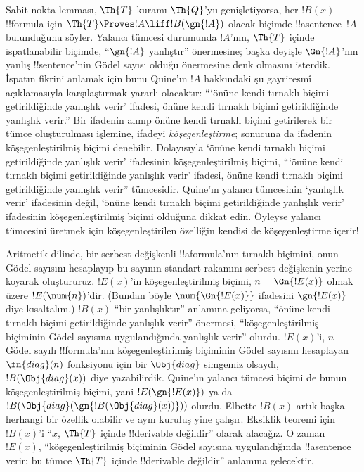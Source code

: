 



\begin{explain}
Sabit nokta lemması, $\Th{T}$ kuramı $\Th{Q}$'yu genişletiyorsa, her
$!B(x)$ !!{formula} için $\Th{T} \Proves !A \liff !B(\gn{!A})$ olacak
biçimde !!a{sentence}~$!A$ bulunduğunu söyler. Yalancı tümcesi durumunda
$!A$'nın, $\Th{T}$ içinde ispatlanabilir biçimde, ``$\gn{!A}$ yanlıştır''
önermesine; başka deyişle $\Gn{!A}$'nın yanlış !!{sentence}'nin G\"odel
sayısı olduğu önermesine denk olmasını isterdik. İspatın fikrini anlamak için
bunu Quine'ın $!A$ hakkındaki şu gayriresmî açıklamasıyla karşılaştırmak
yararlı olacaktır: ``{}`önüne kendi tırnaklı biçimi getirildiğinde yanlışlık
verir' ifadesi, önüne kendi tırnaklı biçimi getirildiğinde yanlışlık verir.''
Bir ifadenin alınıp önüne kendi tırnaklı biçimi getirilerek bir tümce
oluşturulması işlemine, ifadeyi \emph{köşegenleştirme}; sonucuna da ifadenin
köşegenleştirilmiş biçimi denebilir. Dolayısıyla `önüne kendi tırnaklı biçimi
getirildiğinde yanlışlık verir' ifadesinin köşegenleştirilmiş biçimi,
``{}`önüne kendi tırnaklı biçimi getirildiğinde yanlışlık verir' ifadesi,
önüne kendi tırnaklı biçimi getirildiğinde yanlışlık verir'' tümcesidir.
Quine'ın yalancı tümcesinin `yanlışlık verir' ifadesinin değil, `önüne kendi
tırnaklı biçimi getirildiğinde yanlışlık verir' ifadesinin köşegenleştirilmiş
biçimi olduğuna dikkat edin. Öyleyse yalancı tümcesini üretmek için
köşegenleştirilen özelliğin kendisi de köşegenleştirme içerir!{}

Aritmetik dilinde, bir serbest değişkenli !!a{formula}'nın tırnaklı biçimini,
onun G\"odel sayısını hesaplayıp bu sayının standart rakamını serbest
değişkenin yerine koyarak oluştururuz. $!E(x)$'in köşegenleştirilmiş biçimi,
$n=\Gn{!E(x)}$ olmak üzere $!E(\num{n})$'dir. (Bundan böyle
$\num{\Gn{!E(x)}}$ ifadesini $\gn{!E(x)}$ diye kısaltalım.) $!B(x)$ ``bir
yanlışlıktır'' anlamına geliyorsa, ``önüne kendi tırnaklı biçimi getirildiğinde
yanlışlık verir'' önermesi, ``köşegenleştirilmiş biçiminin G\"odel sayısına
uygulandığında yanlışlık verir'' olurdu. $!E(x)$'i, $n$ G\"odel sayılı
!!{formula}'nın köşegenleştirilmiş biçiminin G\"odel sayısını hesaplayan
$\fn{diag}(n)$ fonksiyonu için bir $\Obj{diag}$ simgemiz olsaydı,
$!B(\Obj{diag}(x))$ diye yazabilirdik. Quine'ın yalancı tümcesi biçimi de
bunun köşegenleştirilmiş biçimi, yani $!E(\gn{!E(x)})$ ya da
$!B(\Obj{diag}(\gn{!B(\Obj{diag}(x))}))$ olurdu. Elbette $!B(x)$ artık başka
herhangi bir özellik olabilir ve aynı kuruluş yine çalışır. Eksiklik teoremi
için $!B(x)$'i ``$x$, $\Th{T}$ içinde !!{derivable} değildir'' olarak
alacağız. O zaman $!E(x)$, ``köşegenleştirilmiş biçiminin G\"odel sayısına
uygulandığında !!a{sentence} verir; bu tümce $\Th{T}$ içinde !!{derivable}
değildir'' anlamına gelecektir.


\end{explain}
